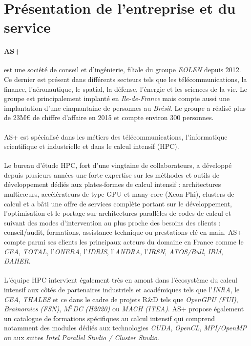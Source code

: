 \section{Présentation de l'entreprise et du service}
\paragraph{AS+}
est une société de conseil et d'ingénierie, filiale du groupe \emph{EOLEN} depuis
2012. Ce dernier est présent dans différents secteurs tels que les
télécommunications, la finance, l'aéronautique, le spatial, la défense,
l'énergie et les sciences de la vie. Le groupe est principalement implanté en
\emph{Ile-de-France} mais compte aussi une implantation d'une cinquantaine de
personnes au \emph{Brésil}. Le groupe a réalisé plus de 23M\euro{} de chiffre
d'affaire en 2015 et compte environ 300 personnes.

\paragraph{}
AS+ est spécialisé dans les métiers des télécommunications, l'informatique
scientifique et industrielle et dans le calcul intensif (HPC).

\paragraph{}
Le bureau d’étude HPC, fort d'une vingtaine de collaborateurs, a développé
depuis plusieurs années une forte expertise sur les méthodes et outils de
développement dédiés aux plates-formes de calcul intensif : architectures
multic\oe{}urs, accélérateurs de type GPU et many-core (Xeon Phi), clusters de
calcul et a bâti une offre de services complète portant sur le développement,
l’optimisation et le portage sur architectures parallèles de codes de calcul et
suivant des modes d’intervention au plus proche des besoins des clients :
conseil/audit, formations, assistance technique ou prestations clé en main. AS+
compte parmi ses clients les principaux acteurs du domaine en France comme le
\emph{CEA}, \emph{TOTAL}, l’\emph{ONERA}, l’\emph{IDRIS}, l’\emph{ANDRA},
l’\emph{IRSN}, \emph{ATOS/Bull}, \emph{IBM}, \emph{DAHER}.

\paragraph{}
\sloppy
L’équipe HPC intervient également très en amont dans l’écosystème du calcul
intensif aux côtés de partenaires industriels et académiques tels que
l’\emph{INRA}, le \emph{CEA}, \emph{THALES} et ce dans le cadre de projets R\&D
tels que \emph{OpenGPU (FUI)}, \emph{Brainomics (FSN)}, \emph{$M^2$DC (H2020)}
ou \emph{MACH (ITEA)}. AS+ propose également un catalogue de formations
spécifiques au calcul intensif qui comprend notamment des modules dédiés aux
technologies \emph{CUDA}, \emph{OpenCL}, \emph{MPI/OpenMP} ou aux suites
\emph{Intel Parallel Studio / Cluster Studio}.

